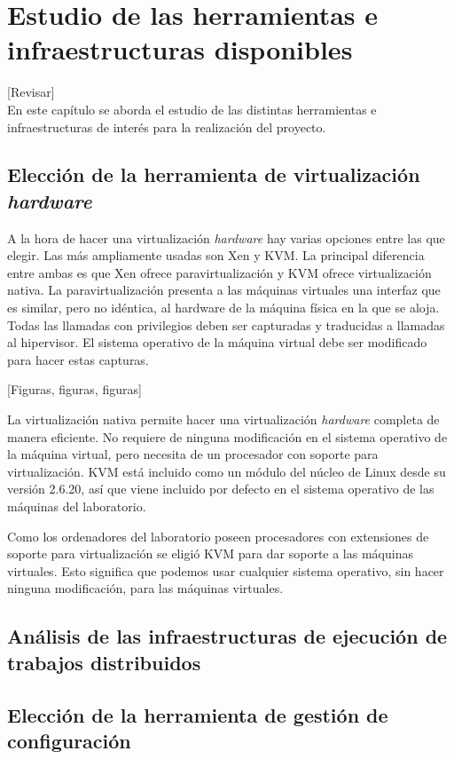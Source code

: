 \chapter{Estudio de las herramientas e infraestructuras disponibles}
\label{cap:estudio}

[Revisar]\\

En este capítulo se aborda el estudio de las distintas herramientas e infraestructuras de interés para la realización del proyecto.


\section{Elección de la herramienta de virtualización \emph{hardware}}

A la hora de hacer una virtualización \emph{hardware} hay varias opciones entre las que elegir. Las más ampliamente usadas son Xen y KVM. La principal diferencia entre ambas es que Xen ofrece paravirtualización y KVM ofrece virtualización nativa.
La paravirtualización presenta a las máquinas virtuales una interfaz que es similar, pero no idéntica, al hardware de la máquina física en la que se aloja. Todas las llamadas con privilegios deben ser capturadas y traducidas a llamadas al hipervisor. El sistema operativo de la máquina virtual debe ser modificado para hacer estas capturas.

[Figuras, figuras, figuras]

La virtualización nativa permite hacer una virtualización \emph{hardware} completa de manera eficiente. No requiere de ninguna modificación en el sistema operativo de la máquina virtual, pero necesita de un procesador con soporte para virtualización. KVM está incluido como un módulo del núcleo de Linux desde su versión 2.6.20, así que viene incluido por defecto en el sistema operativo de las máquinas del laboratorio.

Como los ordenadores del laboratorio poseen procesadores con extensiones de soporte para virtualización se eligió KVM para dar soporte a las máquinas virtuales. Esto significa que podemos usar cualquier sistema operativo, sin hacer ninguna modificación, para las máquinas virtuales.

\section{Análisis de las infraestructuras de ejecución de trabajos distribuidos}


\section{Elección de la herramienta de gestión de configuración}

